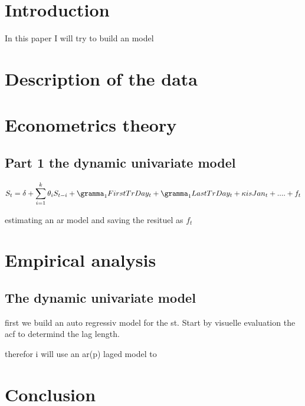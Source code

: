 \documentclass[12pt]{article}
\begin{document}
{\selectfont

\section{Introduction}

In this paper I will try to build an model 


\section{Description of the data}

\section{Econometrics  theory}

\subsection{Part 1 the dynamic univariate model}


\begin{equation}
    S_t = \delta + \sum_{i=1}^{k} \theta_i S_{t-i} + \gramma_1 FirstTrDay_t + \gramma_1 LastTrDay_t + \kappa isJan_t + .... + f_t
\end{equation}


estimating an ar model and saving the resituel as $f_t$

\section{Empirical analysis}

\subsection{The dynamic univariate model}

first we build an auto regressiv model for the st. Start by visuelle evaluation the acf to determind the lag length.




therefor i will use an ar(p) laged model to 


\section{Conclusion}

}
\end{document}
